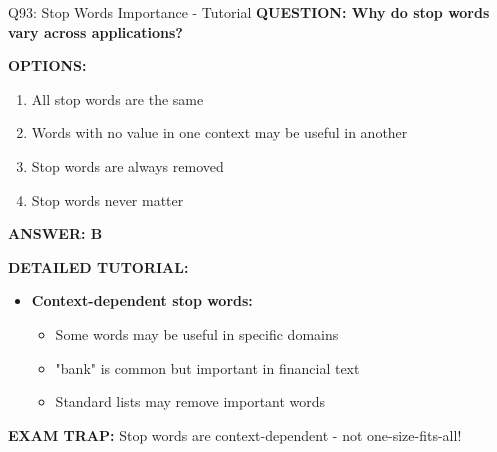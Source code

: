 \documentclass[8pt]{beamer}
\begin{document}
	\begin{frame}{Q93: Stop Words Importance - Tutorial}
		\fontsize{6.5}{7.5}\selectfont
		\textbf{QUESTION: Why do stop words vary across applications?}
		
		\vspace{0.1cm}
		\textbf{OPTIONS:}
		\begin{enumerate}
			\item All stop words are the same
			\item Words with no value in one context may be useful in another
			\item Stop words are always removed
			\item Stop words never matter
		\end{enumerate}
		
		\vspace{0.1cm}
		\textcolor{myblue}{\textbf{ANSWER: B}}
		
		\vspace{0.1cm}
		\textbf{DETAILED TUTORIAL:}
		\begin{itemize}
			\item \textbf{Context-dependent stop words:}
			\begin{itemize}
				\item Some words may be useful in specific domains
				\item "bank" is common but important in financial text
				\item Standard lists may remove important words
			\end{itemize}
		\end{itemize}
		
		\textcolor{myred}{\textbf{EXAM TRAP:}} Stop words are \textcolor{myblue}{context-dependent} - not one-size-fits-all!
	\end{frame}
	
\end{document}

